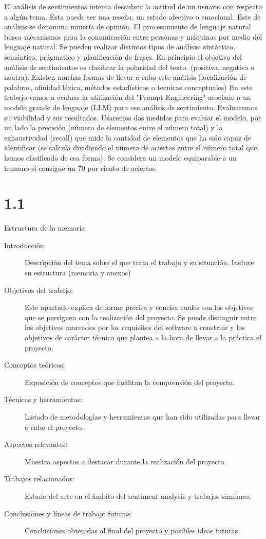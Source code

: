 
El análisis de sentimientos intenta descubrir la actitud de un usuario con respecto a algún tema.
Esta puede ser una reseña, un estado afectivo o emocional. Este de análisis se denomina minería de opinión.
El procesamiento de lenguaje natural busca mecanismos para la comunicación entre personas y máquinas por medio del
lenguaje natural. Se pueden realizar distintos tipos de análisis: sintáctico, semántico, prágmatico y planificación de frases.
En principio el objetivo del análisis de sentimientos es clasificar la polaridad del texto. (positiva, negativa o neutra).
Existen muchas formas de llevar a cabo este análisis (localización de palabras, afinidad léxica, métodos estadísticos o tecnicas conceptuales)
En este trabajo vamos a evaluar la utilización del "Prompt Engineering" asociado a un modelo grande de lenguaje (LLM) para ese análisis de sentimiento.
Evaluaremos su viabilidad y sus resultados. Usaremos dos medidas para evaluar el modelo, por un lado la precisión (número de elementos entre el número total) 
y la exhaustividad (recall) que mide la cantidad de elementos que ha sido capaz de identificar (se calcula dividiendo el número de aciertos entre el número 
total que hemos clasificado de esa forma). Se considera un modelo equiparable a un humano si consigue un 70 por ciento de aciertos.

\section{1.1}{Estructura de la memoria}
\begin{description}
	\item[Introducción:] Descripción del tema sobre el que trata el trabajo y su situación. Incluye su estructura (memoria y anexos)
	\item[Objetivos del trabajo:] Este apartado explica de forma precisa y concisa cuales son los objetivos que se persiguen con la realización del proyecto. Se puede distinguir entre los objetivos marcados por los requisitos del software a construir y los objetivos de carácter técnico que plantea a la hora de llevar a la práctica el proyecto.
    \item[Conceptos teóricos:] Exposición de conceptos que facilitan la comprensión del proyecto.
    \item[Técnicas y herramientas:] Listado de metodologías y herramientas que han sido utilizadas para llevar a cabo el proyecto.
    \item[Aspectos relevantes:] Muestra aspectos a destacar durante la realización del proyecto.
    \item[Trabajos relacionados:] Estado del arte en el ámbito del sentiment analysis y trabajos similares.
    \item[Conclusiones y líneas de trabajo futuras:] Conclusiones obtenidas al final del proyecto y posibles ideas futuras.
\end{description}
